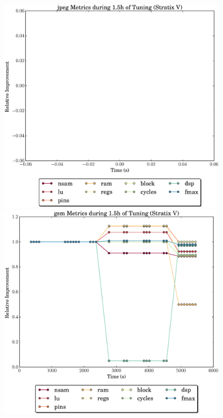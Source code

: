\documentclass[12pt, a4paper]{article}
\begin{document}
\newpage

\begin{figure}[htpb]
    \centering
    \begin{minipage}{.48\textwidth}
        \includegraphics[scale=.29]{jpeg_all_5400_chstone_StratixV}
    \end{minipage}%
    \hfill
    \begin{minipage}{.48\textwidth}
        \includegraphics[scale=.29]{gsm_all_5400_chstone_StratixV}
    \end{minipage}%


\end{figure}
\end{document}
